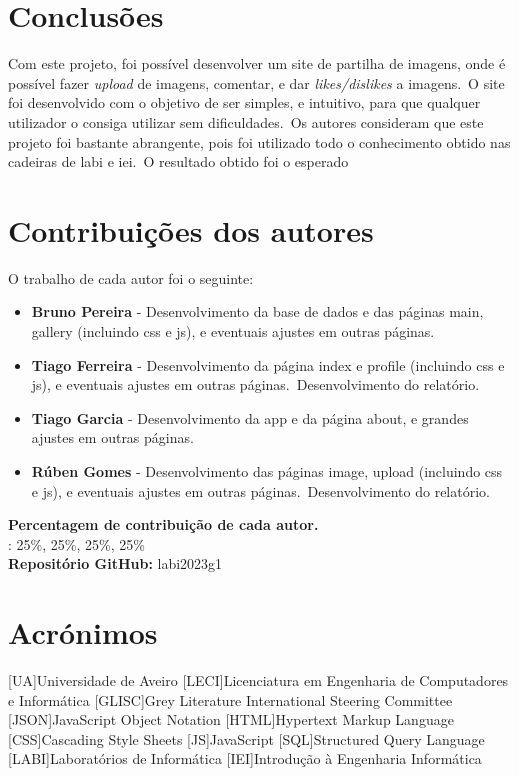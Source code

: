 \documentclass{report}
\begin{document}
\chapter{Conclusões}
\label{chap.conclusao}
Com este projeto, foi possível desenvolver um site de partilha de imagens, onde é possível fazer \textit{upload} de imagens, comentar, e dar \textit{likes/dislikes} a imagens.\ O site foi desenvolvido com o objetivo de ser simples, e intuitivo, para que qualquer utilizador o consiga utilizar sem dificuldades.\ Os autores consideram que este projeto foi bastante abrangente, pois foi utilizado todo o conhecimento obtido nas cadeiras de \ac{labi} e \ac{iei}.\ O resultado obtido foi o esperado

\chapter*{Contribuições dos autores}
O trabalho de cada autor foi o seguinte:
\begin{itemize}
    \item \textbf{Bruno Pereira} - Desenvolvimento da base de dados e das páginas main, gallery (incluindo \ac{css} e \ac{js}), e eventuais ajustes em outras páginas.
    \item \textbf{Tiago Ferreira} - Desenvolvimento da página index e profile (incluindo \ac{css} e \ac{js}), e eventuais ajustes em outras páginas.\ Desenvolvimento do relatório.
    \item \textbf{Tiago Garcia} - Desenvolvimento da app e da página about, e grandes ajustes em outras páginas.
    \item \textbf{Rúben Gomes} - Desenvolvimento das páginas image, upload (incluindo \ac{css} e \ac{js}), e eventuais ajustes em outras páginas.\ Desenvolvimento do relatório.
\end{itemize}

\vspace{10pt}
\textbf{Percentagem de contribuição de cada autor.}\\

\autores : 25\%, 25\%, 25\%, 25\%\\

\textbf{Repositório GitHub:} labi2023g1

\chapter*{Acrónimos}
\begin{acronym}
    [UA]{Universidade de Aveiro}
    [LECI]{Licenciatura em Engenharia de Computadores e Informática}
    [GLISC]{Grey Literature International Steering Committee}
    [JSON]{JavaScript Object Notation}
    [HTML]{Hypertext Markup Language}
    [CSS]{Cascading Style Sheets}
    [JS]{JavaScript}
    [SQL]{Structured Query Language}
    [LABI]{Laboratórios de Informática}
    [IEI]{Introdução à Engenharia Informática}
\end{acronym}


\printbibliography
\end{document}
